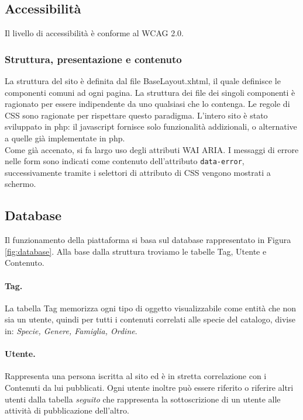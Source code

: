 \documentclass[12pt, a4paper]{article}
\begin{document}
    \subsection{Accessibilità}
    Il livello di accessibilità è conforme al WCAG 2.0.
    \subsubsection*{Struttura, presentazione e contenuto}
    La struttura del sito è definita dal file BaseLayout.xhtml, il quale definisce le componenti comuni ad ogni pagina. La struttura dei file dei singoli componenti è ragionato per essere indipendente da uno qualsiasi che lo contenga. Le regole di CSS sono ragionate per rispettare questo paradigma. L'intero sito è stato sviluppato in php: il javascript fornisce solo funzionalità addizionali, o alternative a quelle già implementate in php. \\
    Come già accenato, si fa largo uso degli attributi WAI ARIA. 
    I messaggi di errore nelle form sono indicati come contenuto dell'attributo \texttt{data-error}, successivamente tramite i selettori di attributo di CSS vengono mostrati a schermo.
    \subsection{Database}
    Il funzionamento della piattaforma si basa sul database rappresentato in Figura \ref{fig:database}.
    Alla base dalla struttura troviamo le tabelle Tag, Utente e Contenuto.
    \paragraph{Tag.} La tabella Tag memorizza ogni tipo di oggetto visualizzabile come entità che non sia un utente,
                    quindi per tutti i contenuti correlati alle specie del catalogo, divise in: \emph{Specie, Genere, Famiglia, Ordine}.
    \paragraph{Utente.} Rappresenta una persona iscritta al sito ed è in stretta correlazione con i Contenuti da lui pubblicati.
                        Ogni utente inoltre può essere riferito o riferire altri utenti dalla tabella \emph{seguito}
                        che rappresenta la sottoscrizione di un utente alle attività di pubblicazione dell'altro.
\end{document}
